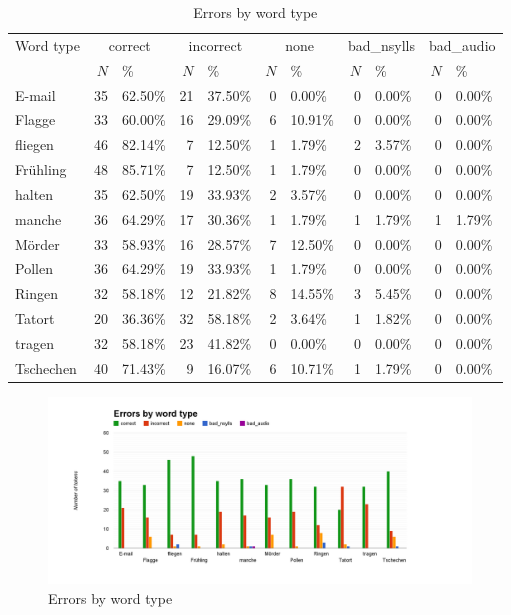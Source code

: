 			\begin{table}[ht]
				\centering
				\caption[Errors by word type]{Errors by word type  }
				\begin{tabularx}{\textwidth}{lrXrXrXrXrX}
				\toprule
				Word type & \multicolumn{2}{c}{correct}		& \multicolumn{2}{c}{incorrect} &		\multicolumn{2}{c}{none} &		\multicolumn{2}{c}{bad\_nsylls} & 		\multicolumn{2}{c}{bad\_audio} \\	
				& $N$ & \% & $N$ & \% & $N$ & \% & $N$ & \% & $N$ & \% \\
					\midrule
E-mail &	35	& 62.50\%	&21&	37.50\%&	0	&0.00\%&	0	&0.00\%	& 0	& 0.00\% \\
Flagge	& 33	&60.00\%	 &	16	 &	29.09\%	 &	6	 &	10.91\%	 &	0	 &	0.00\%	 &	0	 &	0.00\%\\
fliegen &	46	&82.14\%	 &	7	 &	12.50\% &		1	 &	1.79\% &		2	 &	3.57\%	 &	0	 &	0.00\%\\
Fr\"{u}hling &	48&	85.71\% &		7	 &	12.50\% &		1 &		1.79\%	 &	0	 &	0.00\% &		0	 &	0.00\%\\
halten &	35	&62.50\%	 &	19	 &	33.93\%	 &	2 &		3.57\%	 &	0	 &	0.00\%	 &	0	 &	0.00\%\\
manche&	36	&64.29\%	 &	17	 &	30.36\%	 &	1	 &	1.79\%	 &	1	 &	1.79\% &		1	 &	1.79\%\\
M\"{o}rder	&33&	58.93\%	 &	16	 &	28.57\%	 &	7	 &	12.50\%	 &	0	 &	0.00\%	 &	0	 &	0.00\%\\
Pollen	& 36	&64.29\%	 &	19	 &	33.93\%	 &	1	 &	1.79\%	 &	0	 &	0.00\%	 &	0	 &	0.00\%\\
Ringen	& 32	&58.18\%	 &	12	 &	21.82\%	 &	8	 &	14.55\%	 &	3	 &	5.45\%	 &	0	 &	0.00\%\\
Tatort	& 20	&36.36\%	 &	32	 &	58.18\%	 &	2	 &	3.64\%	 &	1	 &	1.82\%	 &	0	 &	0.00\%\\
tragen	& 32	&58.18\%	 &	23	 &	41.82\%	 &	0	 &	0.00\%	 &	0	 &	0.00\%	 &	0	 &	0.00\%\\
Tschechen &	40	&71.43\%&	9	 &	16.07\%	 &	6	 &	10.71\%	 &	1	 &	1.79\% &		0	 &	0.00\% \\
					\bottomrule
				\end{tabularx}
				\label{fig:results:wordtype}
			\end{table}
			
			\begin{figure}[ht]
				\centering
				\includegraphics[width=\textwidth]{img/annotation/wordBars}
				\caption{Errors by word type}
				\label{fig:results:wordbars}
			\end{figure}		
		
